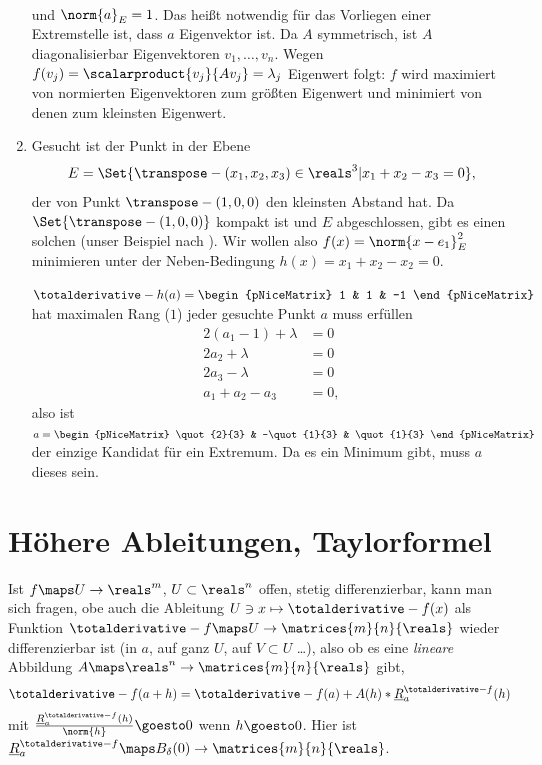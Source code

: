 \begin{beispiele*}
\begin{enumerate}
\begin{align*}
    \end{align*}
    und \( \norm{a}_E=1 \). Das heißt notwendig für das Vorliegen einer Extremstelle ist, dass \( a \) Eigenvektor ist. Da \( A \) symmetrisch, ist \( A \) diagonalisierbar \timplies \texists  Eigenvektoren \( v_1,\dotsc, v_n \). Wegen \( f(v_j)=\scalarproduct{v_j}{A v_j}=\lambda_j \) Eigenwert folgt: \( f \) wird maximiert von normierten Eigenvektoren zum größten Eigenwert und minimiert von denen zum kleinsten Eigenwert.
    \item Gesucht ist der Punkt in der Ebene
    \begin{equation*}
      E=\Set{\transpose-{(x_1,x_2,x_3)}\in \reals^3|x_1+x_2-x_3=0},
    \end{equation*}
    der von Punkt \( \transpose-{(1,0,0)} \) den kleinsten Abstand hat. Da \( \Set{\transpose-{(1,0,0)}} \) kompakt ist und \( E \) abgeschlossen, gibt es einen solchen (\vgl unser Beispiel nach ). Wir wollen also \( f(x)=\norm{x-e_1}_E^2 \) minimieren unter der Neben-Bedingung \( h(x)=x_1+x_2-x_2=0 \).

    \( \totalderivative-{h}(a)=\begin{pNiceMatrix} 1 & 1 & -1 \end{pNiceMatrix} \) hat maximalen Rang (\( 1 \)) \dh jeder gesuchte Punkt \( a  \) muss erfüllen
      \begin{align*}
        2(a_1-1)+\lambda&=0\\
        2a_2+\lambda&=0\\
        2a_3-\lambda&=0\\
        a_1+a_2-a_3&=0,
      \end{align*}
    also ist \( a=\begin{pNiceMatrix} \quot{2}{3} & -\quot{1}{3} & \quot{1}{3} \end{pNiceMatrix} \) der einzige Kandidat für ein Extremum. Da es ein Minimum gibt, muss \( a \) dieses sein.
    \end{enumerate}
\end{beispiele*}
\section*{Höhere Ableitungen, Taylorformel}
Ist \( f\maps U\to \reals^m \), \( U\subset \reals^n \) offen, stetig differenzierbar, kann man sich fragen, obe auch die Ableitung \( U\ni x\mapsto \totalderivative-{f}(x) \) als Funktion \( \totalderivative-{f}\maps U\to \matrices{m}{n}{\reals} \) wieder differenzierbar ist (in \( a \), auf ganz \( U \), auf \( V\subset U \) \dots), also ob es eine \emph{lineare} Abbildung \( A\maps \reals^n\to \matrices{m}{n}{\reals} \) gibt, \sd 
\begin{equation*}
  \totalderivative-{f}(a+h)=\totalderivative-{f}(a)+A(h)*\underline{R}_a^{\totalderivative-{f}}(h)
\end{equation*}
mit \( \frac{\underline{R}_a^{\totalderivative-{f}}(h)}{\norm{h}}\goesto 0 \) wenn \( h\goesto 0 \). Hier ist \( \underline{R}_a^{\totalderivative-{f}}\maps B_{\delta}(0)\to \matrices{m}{n}{\reals} \). 

